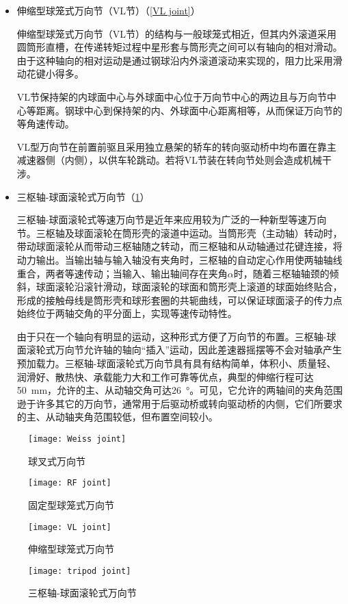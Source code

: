 \documentclass[UTF8]{ctexart}
\numberwithin{figure}{section}
\numberwithin{table}{section}
\begin{document}
\begin{itemize}
	\item 伸缩型球笼式万向节（VL节）（\cref{VL joint}）

	      伸缩型球笼式万向节（VL节）的结构与一般球笼式相近，但其内外滚道采用圆筒形直槽，在传递转矩过程中星形套与筒形壳之间可以有轴向的相对滑动。由于这种轴向的相对运动是通过钢球沿内外滚道滚动来实现的，阻力比采用滑动花键小得多。

	      VL节保持架的内球面中心与外球面中心位于万向节中心的两边且与万向节中心等距离。钢球中心到保持架的内、外球面中心距离相等，从而保证万向节的等角速传动。

	      VL型万向节在前置前驱且采用独立悬架的轿车的转向驱动桥中均布置在靠主减速器侧（内侧），以供车轮跳动。若将VL节装在转向节处则会造成机械干涉。

	\item 三枢轴-球面滚轮式万向节（\cref{tripod joint}）

	      三枢轴-球面滚轮式等速万向节是近年来应用较为广泛的一种新型等速万向节。三枢轴及球面滚轮在筒形壳的滚道中运动。当筒形壳（主动轴）转动时，带动球面滚轮从而带动三枢轴随之转动，而三枢轴和从动轴通过花键连接，将动力输出。当输出轴与输入轴没有夹角时，三枢轴的自动定心作用使两轴轴线重合，两者等速传动；当输入、输出轴间存在夹角$\alpha$时，随着三枢轴轴颈的倾斜，球面滚轮沿滚针滑动，球面滚轮的球面和筒形壳上滚道的球面始终贴合，形成的接触母线是筒形壳和球形套圈的共轭曲线，可以保证球面滚子的传力点始终位于两轴交角的平分面上，实现等速传动特性。

	      由于只在一个轴向有明显的运动，这种形式方便了万向节的布置。三枢轴-球面滚轮式万向节允许轴的轴向“插入”运动，因此差速器摇摆等不会对轴承产生预加载力。三枢轴-球面滚轮式万向节具有具有结构简单，体积小、质量轻、润滑好、散热快、承载能力大和工作可靠等优点，典型的伸缩行程可达\SI{50}{\mm}，允许的主、从动轴交角可达\SI{26}{\degree}。可见，它允许的两轴间的夹角范围逊于许多其它的万向节，通常用于后驱动桥或转向驱动桥的内侧，它们所要求的主、从动轴夹角范围较低，但布置空间较小。
\end{itemize}

\begin{figure}[htbp]
	\centering
	\begin{minipage}[b]{0.6\textwidth}
		\centering
		\texttt{[image: Weiss joint]}
		\caption{球叉式万向节}
		\label{Weiss joint}
	\end{minipage}
	\begin{minipage}[b]{0.5\textwidth}
		\centering
		\texttt{[image: RF joint]}
		\caption{固定型球笼式万向节}
		\label{RF joint}
	\end{minipage}
	\begin{minipage}[b]{0.4\textwidth}
		\centering
		\texttt{[image: VL joint]}
		\caption{伸缩型球笼式万向节}
		\label{VL joint}
	\end{minipage}
	\begin{minipage}[b]{0.5\textwidth}
		\centering
		\texttt{[image: tripod joint]}
		\caption{三枢轴-球面滚轮式万向节}
		\label{tripod joint}
	\end{minipage}
\end{figure}

\clearpage
\end{document}

